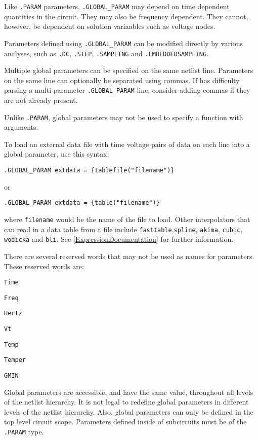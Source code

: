 \begin{Command}
Like \texttt{.PARAM} parameters, \texttt{.GLOBAL\_PARAM} may
depend on time dependent quantities in the circuit.  They may also
be frequency dependent.  They cannot, however, be 
dependent on solution variaables such as voltage nodes.

Parameters defined using \texttt{.GLOBAL\_PARAM} can be modified directly by various analyses, such as \texttt{.DC},   
\texttt{.STEP}, \texttt{.SAMPLING} and \texttt{.EMBEDDEDSAMPLING}.

Multiple global parameters can be specified on the same netlist line.  
Parameters on the same line can optionally be separated using commas.  If \Xyce{} has difficulty 
parsing a multi-parameter \texttt{.GLOBAL\_PARAM} line, consider adding commas if they are not already present.

Unlike \texttt{.PARAM}, global parameters may not be used to specify a function with arguments.

To load an external data file with time voltage pairs of data on each 
line into a global parameter, use this syntax:

\texttt{.GLOBAL\_PARAM extdata = \{tablefile("filename")\}}

or

\texttt{.GLOBAL\_PARAM extdata = \{table("filename")\}}

where \texttt{filename} would be the name of the file to load.  
Other interpolators that can read in a data table from a file 
include \texttt{fasttable},\texttt{spline}, \texttt{akima}, \texttt{cubic}, 
\texttt{wodicka} and \texttt{bli}.  See \ref{ExpressionDocumentation} 
for further information. 

There are several reserved words that may not be used as names for parameters.  These reserved words are:
\begin{XyceItemize}
\item \verb+Time+
\item \verb+Freq+ 
\item \verb+Hertz+ 
\item \verb+Vt+
\item \verb+Temp+
\item \verb+Temper+
\item \verb+GMIN+
\end{XyceItemize}

Global parameters are accessible, and have the same value, throughout all
levels of the netlist hierarchy.  It is not legal to redefine global parameters
in different levels of the netlist hierarchy.  Also, global parameters can only 
  be defined in the top level circuit scope.   Parameters defined inside of 
  subcircuits must be of the \texttt{.PARAM} type.

\end{Command}
